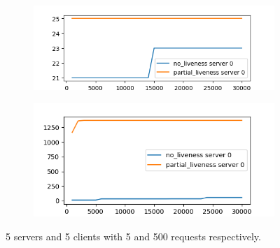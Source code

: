 \documentclass[11pt]{article}
\begin{document}
\begin{figure}[H]
    \begin{subfigure}[b]{0.5\textwidth}
    \centering
    \includegraphics[width=\textwidth]{no_liveness_partial_liveness.png}
  \end{subfigure}%
    \begin{subfigure}[b]{0.5\textwidth}
    \centering
    \includegraphics[width=\textwidth]{medium.png}
    \end{subfigure}
    \centering
    \caption{5 servers and 5 clients with 5 and 500 requests respectively.}
    \vspace{-15pt}
\end{figure}
\end{document}
